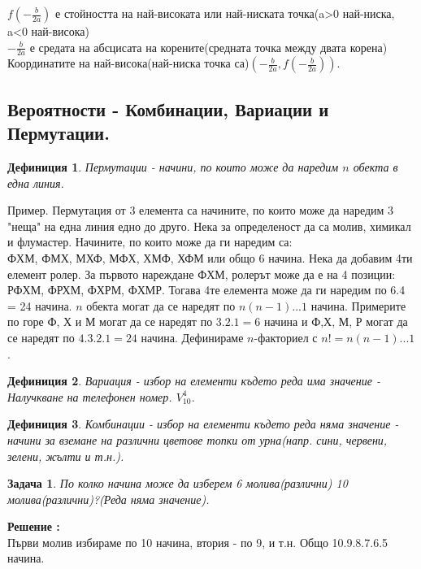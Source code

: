 \documentclass{article}
\newtheorem{definition}{Дефиниция}
\newtheorem{problem}{Задача}
\newcounter{solution}
\newcommand\solution{%
	\stepcounter{solution}%
	\textbf{Решение :}\\%
}
\begin{document}
$f(-\frac{b}{2a})  $ е стойността на най-високата или най-ниската точка(a>0 най-ниска, a<0 най-висока) \\
$-\frac{b}{2a} $ е средата на абсцисата на корените(средната точка между двата корена)
Координатите на най-висока(най-ниска точка са)$ (-\frac{b}{2a}, f(-\frac{b}{2a})) $.

\subsection{Вероятности - Комбинации, Вариации и Пермутации.}

\begin{definition}
	Пермутации - начини, по които може да наредим $n$ обекта в една линия.
\end{definition}
Пример. Пермутация от 3 елемента са начините, по които може да наредим 3 "неща" на една линия едно до друго. Нека за определеност да са молив, химикал и флумастер. Начините, по които може да ги наредим са: \\
ФХМ, ФМХ, МХФ, МФХ, ХМФ, ХФМ или общо 6 начина. Нека да добавим 4ти елемент ролер. За първото нареждане ФХМ, ролерът може да е на 4 позиции:
РФХМ, ФРХМ, ФХРМ, ФХМР. Тогава 4те елемента може да ги наредим по 6.4 = 24 начина. $n$ обекта могат да се наредят по $n(n-1)...1$ начина. 
Примерите по горе Ф, Х и М могат да се наредят по $3.2.1 =6 $ начина и Ф,Х, М, Р могат да се наредят по $4.3.2.1 = 24$ начина. Дефинираме $n$-факториел с $n! = n(n-1)...1$.


\begin{definition}
Вариация - избор на елементи където реда има значение - Налучкване на телефонен номер. $V_{10}^4$.
\end{definition}


\begin{definition}
	Комбинации - избор на елементи където реда няма значение - начини за вземане на различни цветове топки от урна(напр. сини, червени, зелени, жълти и т.н.).
\end{definition}

\begin{problem}
По колко начина може да изберем 6 молива(различни) 10 молива(различни)?(Реда няма значение).
\end{problem}
\solution Първи молив избираме по 10 начина, втория - по 9, и т.н. Общо 10.9.8.7.6.5 начина.
\end{document}
